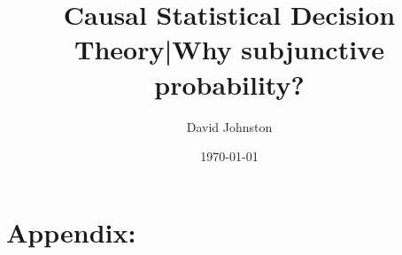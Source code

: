 \documentclass{article}
\title{Causal Statistical Decision Theory|Why subjunctive probability?}
\date{\today}
\author{ David Johnston }
\theoremstyle{plain}
\theoremstyle{definition}
\begin{document}
\maketitle




% 
% 
% 
% 
% 
% 
% 
% 
% 
% 
% 
% 





\appendix
\newpage
\section*{Appendix:}

% 
\end{document}
